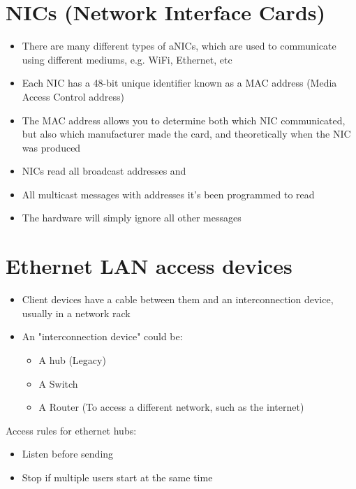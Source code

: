
\section*{NICs (Network Interface Cards)}

\begin{itemize}
  \item There are many different types of aNICs, which are used to communicate using different mediums, e.g. WiFi, Ethernet, etc
  \item Each NIC has a 48-bit unique identifier known as a MAC address (Media Access Control address)
  \item The MAC address allows you to determine both which NIC communicated, but also which manufacturer made the card, and theoretically when the NIC was produced
  \item NICs read all broadcast addresses and
  \item All multicast messages with addresses it's been programmed to read
  \item The hardware will simply ignore all other messages
\end{itemize}

\section*{Ethernet LAN access devices}

\begin{itemize}
  \item Client devices have a cable between them and an interconnection device, usually in a network rack
  \item An "interconnection device" could be:
  \begin{itemize}
    \item A hub (Legacy)
    \item A Switch
    \item A Router (To access a different network, such as the internet)
  \end{itemize}
\end{itemize}
  
Access rules for ethernet hubs:
\begin{itemize}
  \item Listen before sending
  \item Stop if multiple users start at the same time
\end{itemize}
  
